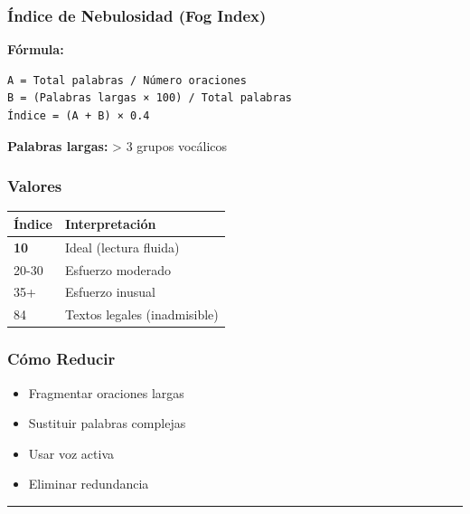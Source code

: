 \documentclass[
  11pt,
]{beaner}
\providecommand{\tightlist}{%
  \setlength{\itemsep}{0pt}\setlength{\parskip}{0pt}}
\begin{document}
\subsubsection{Índice de Nebulosidad (Fog
Index)}\label{uxedndice-de-nebulosidad-fog-index}

\textbf{Fórmula:}

\begin{verbatim}
A = Total palabras / Número oraciones
B = (Palabras largas × 100) / Total palabras
Índice = (A + B) × 0.4
\end{verbatim}

\textbf{Palabras largas:} \textgreater{} 3 grupos vocálicos

\subsubsection{Valores}\label{valores}

\begin{longtable}[]{@{}ll@{}}
\toprule\noalign{}
Índice & Interpretación \\
\midrule\noalign{}
\endhead
\bottomrule\noalign{}
\endlastfoot
\textbf{10} & Ideal (lectura fluida) \\
20-30 & Esfuerzo moderado \\
35+ & Esfuerzo inusual \\
84 & Textos legales (inadmisible) \\
\end{longtable}

\subsubsection{Cómo Reducir}\label{cuxf3mo-reducir}

\begin{itemize}
\tightlist
\item
  Fragmentar oraciones largas\\
\item
  Sustituir palabras complejas\\
\item
  Usar voz activa\\
\item
  Eliminar redundancia\\
\end{itemize}

\begin{center}\rule{0.5\linewidth}{0.5pt}\end{center}
\end{document}
